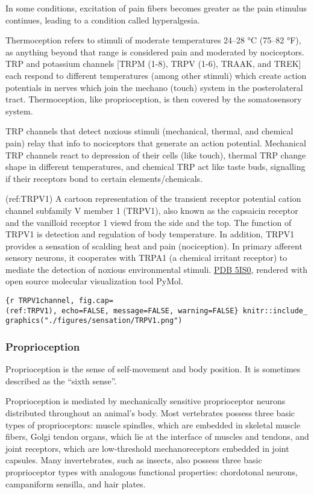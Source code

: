 In some conditions, excitation of pain fibers becomes greater as the
pain stimulus continues, leading to a condition called hyperalgesia.

Thermoception refers to stimuli of moderate temperatures 24--28 °C
(75--82 °F), as anything beyond that range is considered pain and
moderated by nociceptors. TRP and potassium channels {[}TRPM (1-8), TRPV
(1-6), TRAAK, and TREK{]} each respond to different temperatures (among
other stimuli) which create action potentials in nerves which join the
mechano (touch) system in the posterolateral tract. Thermoception, like
proprioception, is then covered by the somatosensory system.

TRP channels that detect noxious stimuli (mechanical, thermal, and
chemical pain) relay that info to nociceptors that generate an action
potential. Mechanical TRP channels react to depression of their cells
(like touch), thermal TRP change shape in different temperatures, and
chemical TRP act like taste buds, signalling if their receptors bond to
certain elements/chemicals.

(ref:TRPV1) A cartoon representation of the transient receptor potential
cation channel subfamily V member 1 (TRPV1), also known as the capsaicin
receptor and the vanilloid receptor 1 viewd from the side and the top.
The function of TRPV1 is detection and regulation of body temperature.
In addition, TRPV1 provides a sensation of scalding heat and pain
(nociception). In primary afferent sensory neurons, it cooperates with
TRPA1 (a chemical irritant receptor) to mediate the detection of noxious
environmental stimuli. \href{https://www.rcsb.org/structure/5IS0}{PDB
5IS0}, rendered with open source molecular visualization tool PyMol.

\texttt{\{r\ TRPV1channel,\ fig.cap=\textquotesingle{}(ref:TRPV1)\textquotesingle{},\ echo=FALSE,\ message=FALSE,\ warning=FALSE\}\ knitr::include\_graphics("./figures/sensation/TRPV1.png")}

\hypertarget{proprioception}{%
\subsubsection{Proprioception}\label{proprioception}}

Proprioception is the sense of self-movement and body position. It is
sometimes described as the ``sixth sense''.

Proprioception is mediated by mechanically sensitive proprioceptor
neurons distributed throughout an animal's body. Most vertebrates
possess three basic types of proprioceptors: muscle spindles, which are
embedded in skeletal muscle fibers, Golgi tendon organs, which lie at
the interface of muscles and tendons, and joint receptors, which are
low-threshold mechanoreceptors embedded in joint capsules. Many
invertebrates, such as insects, also possess three basic proprioceptor
types with analogous functional properties: chordotonal neurons,
campaniform sensilla, and hair plates.

